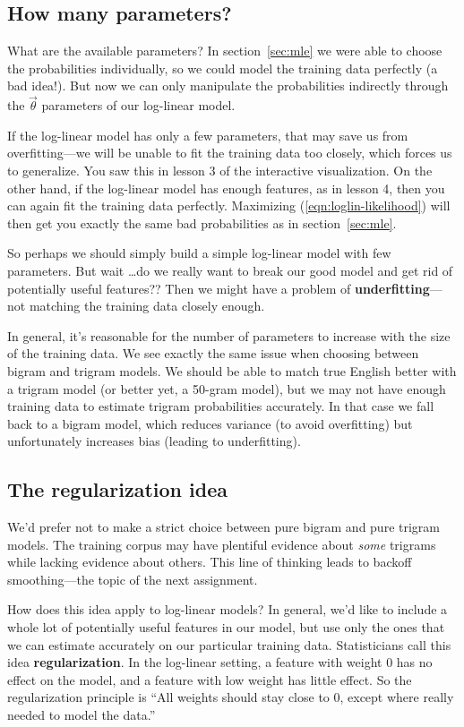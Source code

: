 \documentclass[11pt]{article}
\newcommand{\vtheta}{\vec{\theta}}
\begin{document}
\subsection{How many parameters?}

What are the available parameters?  In section~\ref{sec:mle} we were
able to choose the probabilities individually, so we could model the
training data perfectly (a bad idea!).  But now we can only manipulate
the probabilities indirectly through the $\vtheta$ parameters of our
log-linear model.

If the log-linear model has only a few parameters, that may save us
from overfitting---we will be unable to fit the training data too
closely, which forces us to generalize.  You saw this in lesson 3 of
the interactive visualization.  On the other hand, if the log-linear
model has enough features, as in lesson 4, then you can again fit the
training data perfectly.  Maximizing (\ref{eqn:loglin-likelihood})
will then get you exactly the same bad probabilities as in
section~\ref{sec:mle}.

So perhaps we should simply build a simple log-linear model with few
parameters.  But wait \ldots do we really want to break our good model
and get rid of potentially useful features??  Then we might have a
problem of {\bf underfitting}---not matching the training data closely
enough.

In general, it's reasonable for the number of parameters to increase
with the size of the training data.  We see exactly the same issue
when choosing between bigram and trigram models.  We should be able to
match true English better with a trigram model (or better yet, a
50-gram model), but we may not have enough training data to estimate
trigram probabilities accurately.  In that case we fall back to a
bigram model, which reduces variance (to avoid overfitting) but
unfortunately increases bias (leading to underfitting).

\subsection{The regularization idea}

We'd prefer not to make a strict choice between pure bigram and
pure trigram models.  The training corpus may have plentiful evidence
about {\em some} trigrams while lacking evidence about others.  This
line of thinking leads to backoff smoothing---the topic of the next
assignment.

How does this idea apply to log-linear models?  In general, we'd like
to include a whole lot of potentially useful features in our model,
but use only the ones that we can estimate accurately on our
particular training data.  Statisticians call this idea {\bf
  regularization}.  In the log-linear setting, a feature with weight 0
has no effect on the model, and a feature with low weight has little
effect.  So the regularization principle is ``All weights should stay
close to 0, except where really needed to model the data.''
\end{document}
